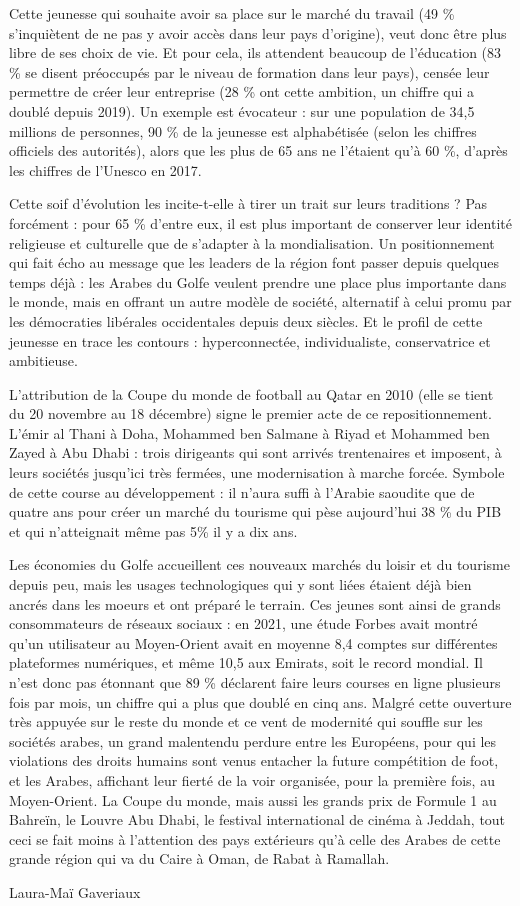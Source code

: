 Cette jeunesse qui souhaite avoir sa place sur le marché du travail (49 \% s'inquiètent de ne pas y avoir accès dans leur pays d'origine), veut donc être plus libre de ses choix de vie. Et pour cela, ils attendent beaucoup de l'éducation (83 \% se disent préoccupés par le niveau de formation dans leur pays), censée leur permettre de créer leur entreprise (28 \% ont cette ambition, un chiffre qui a doublé depuis 2019). Un exemple est évocateur : sur une population de 34,5 millions de personnes, 90 \% de la jeunesse est alphabétisée (selon les chiffres officiels des autorités), alors que les plus de 65 ans ne l'étaient qu'à 60 \%, d'après les chiffres de l'Unesco en 2017.

Cette soif d'évolution les incite-t-elle à tirer un trait sur leurs traditions ? Pas forcément : pour 65 \% d'entre eux, il est plus important de conserver leur identité religieuse et culturelle que de s'adapter à la mondialisation. Un positionnement qui fait écho au message que les leaders de la région font passer depuis quelques temps déjà : les Arabes du Golfe veulent prendre une place plus importante dans le monde, mais en offrant un autre modèle de société, alternatif à celui promu par les démocraties libérales occidentales depuis deux siècles. Et le profil de cette jeunesse en trace les contours : hyperconnectée, individualiste, conservatrice et ambitieuse.

L'attribution de la Coupe du monde de football au Qatar en 2010 (elle se tient du 20 novembre au 18 décembre) signe le premier acte de ce repositionnement. L'émir al Thani à Doha, Mohammed ben Salmane à Riyad et Mohammed ben Zayed à Abu Dhabi : trois dirigeants qui sont arrivés trentenaires et imposent, à leurs sociétés jusqu'ici très fermées, une modernisation à marche forcée. Symbole de cette course au développement : il n'aura suffi à l'Arabie saoudite que de quatre ans pour créer un marché du tourisme qui pèse aujourd'hui 38 \% du PIB et qui n'atteignait même pas 5\% il y a dix ans.

Les économies du Golfe accueillent ces nouveaux marchés du loisir et du tourisme depuis peu, mais les usages technologiques qui y sont liées étaient déjà bien ancrés dans les moeurs et ont préparé le terrain. Ces jeunes sont ainsi de grands consommateurs de réseaux sociaux : en 2021, une étude Forbes avait montré qu'un utilisateur au Moyen-Orient avait en moyenne 8,4 comptes sur différentes plateformes numériques, et même 10,5 aux Emirats, soit le record mondial. Il n'est donc pas étonnant que 89 \% déclarent faire leurs courses en ligne plusieurs fois par mois, un chiffre qui a plus que doublé en cinq ans. Malgré cette ouverture très appuyée sur le reste du monde et ce vent de modernité qui souffle sur les sociétés arabes, un grand malentendu perdure entre les Européens, pour qui les violations des droits humains sont venus entacher la future compétition de foot, et les Arabes, affichant leur fierté de la voir organisée, pour la première fois, au Moyen-Orient. La Coupe du monde, mais aussi les grands prix de Formule 1 au Bahreïn, le Louvre Abu Dhabi, le festival international de cinéma à Jeddah, tout ceci se fait moins à l'attention des pays extérieurs qu'à celle des Arabes de cette grande région qui va du Caire à Oman, de Rabat à Ramallah.

Laura-Maï Gaveriaux
